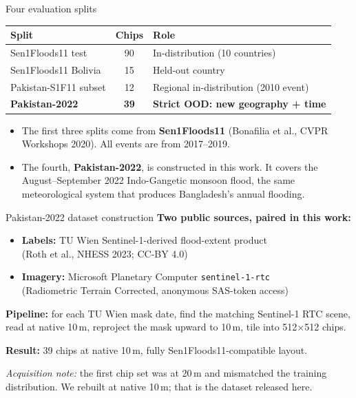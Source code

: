 \documentclass[aspectratio=169,11pt]{beamer}
\begin{document}
\begin{frame}{Four evaluation splits}
\begin{center}
\small
\begin{tabular}{lcl}
\toprule
\textbf{Split} & \textbf{Chips} & \textbf{Role} \\
\midrule
Sen1Floods11 test       & 90  & In-distribution (10 countries) \\
Sen1Floods11 Bolivia    & 15  & Held-out country \\
Pakistan-S1F11 subset   & 12  & Regional in-distribution (2010 event) \\
\textcolor{accent}{\textbf{Pakistan-2022}} & \textcolor{accent}{\textbf{39}} & \textcolor{accent}{\textbf{Strict OOD: new geography + time}} \\
\bottomrule
\end{tabular}
\end{center}
\vspace{0.6em}
\begin{itemize}
    \item The first three splits come from \textbf{Sen1Floods11} (Bonafilia et al., CVPR Workshops 2020). All events are from 2017--2019.
    \item The fourth, \textbf{Pakistan-2022}, is constructed in this work. It covers the August--September 2022 Indo-Gangetic monsoon flood, the same meteorological system that produces Bangladesh's annual flooding.
\end{itemize}
\end{frame}

\begin{frame}{Pakistan-2022 dataset construction}
\textbf{Two public sources, paired in this work:}
\begin{itemize}
    \item \textbf{Labels:} TU Wien Sentinel-1-derived flood-extent product\\ (Roth et al., NHESS 2023; CC-BY 4.0)
    \item \textbf{Imagery:} Microsoft Planetary Computer \texttt{sentinel-1-rtc}\\ (Radiometric Terrain Corrected, anonymous SAS-token access)
\end{itemize}
\vspace{0.6em}

\textbf{Pipeline:} for each TU Wien mask date, find the matching Sentinel-1 RTC scene, read at native 10\,m, reproject the mask upward to 10\,m, tile into 512$\times$512 chips.

\vspace{0.6em}
\textbf{Result:} 39 chips at native 10\,m, fully Sen1Floods11-compatible layout.

\vspace{0.4em}
\textcolor{warn}{\emph{Acquisition note:}} the first chip set was at 20\,m and mismatched the training distribution. We rebuilt at native 10\,m; that is the dataset released here.
\end{frame}
\end{document}
